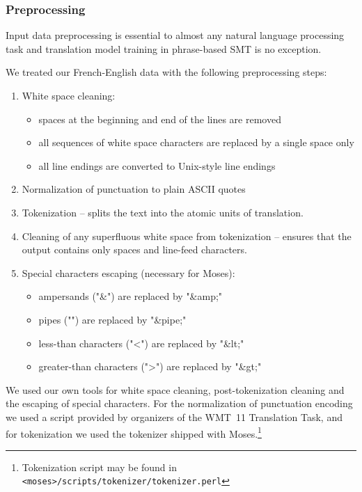 \subsubsection*{Preprocessing}

Input data preprocessing is essential to almost any natural language processing task
and translation model training in phrase-based SMT is no exception.

We treated our French-English data with the following preprocessing steps:
\begin{enumerate}
  \item White space cleaning:
  \begin{itemize}
    \item spaces at the beginning and end of the lines are removed
    \item all sequences of white space characters are replaced by a single space only
    \item all line endings are converted to Unix-style line endings
  \end{itemize}
  \item Normalization of punctuation to plain ASCII quotes
  \item Tokenization -- splits the text into the atomic units of translation.
  \item Cleaning of any superfluous white space from tokenization -- ensures that the output contains only spaces and line-feed characters.
  \item Special characters escaping (necessary for Moses):
  \begin{itemize}
    \item ampersands ("\&") are replaced by "\&amp;"
    \item pipes ("\textbar") are replaced by "\&pipe;"
    \item less-than characters ("<") are replaced by "\&lt;"
    \item greater-than characters (">") are replaced by "\&gt;"
  \end{itemize}
\end{enumerate}

We used our own tools for white space cleaning, post-tokenization cleaning
and the escaping of special characters.
For the normalization of punctuation encoding we used a script provided by organizers of
the WMT~11 Translation Task,
and for tokenization we used the tokenizer shipped with
Moses.\footnote{Tokenization script may be found in \texttt{<moses>/scripts/tokenizer/tokenizer.perl}}

